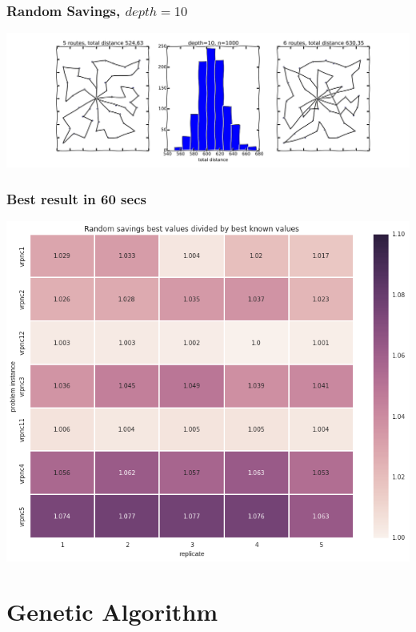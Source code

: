 \documentclass{beamer}
\begin{document}
\begin{frame}
\frametitle{Random Savings, $depth=10$}
\begin{center}
\includegraphics[scale=0.25]{figs/random_savings10}

\end{center}
\end{frame}


\begin{frame}
\frametitle{Best result in 60 secs}
\begin{center}
\includegraphics[scale=0.25]{figs/rs_best}

\end{center}
\end{frame}



\section{Genetic Algorithm}
\end{document}
